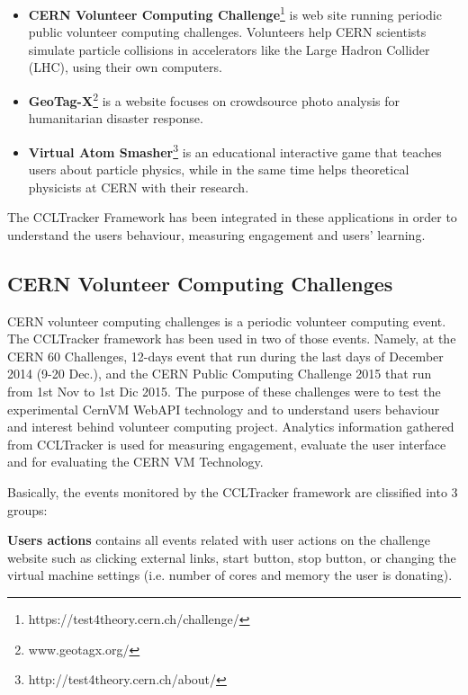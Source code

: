 \documentclass{article}
\begin{document}
\begin{itemize}
\item \textbf{CERN Volunteer Computing Challenge}\footnote{https://test4theory.cern.ch/challenge/} is  web site running periodic public volunteer computing challenges. Volunteers help CERN scientists simulate particle collisions in accelerators like the Large Hadron Collider (LHC), using their own computers. 

\item \textbf{GeoTag-X}\footnote{www.geotagx.org/} is a website focuses on crowdsource photo analysis for humanitarian disaster response.

\item \textbf{Virtual Atom Smasher}\footnote{http://test4theory.cern.ch/about/} is an educational interactive game that teaches users about particle physics, while in the same time helps theoretical physicists at CERN with their research.
\end{itemize}


The CCLTracker Framework has been integrated in these applications in order to understand the users behaviour, measuring engagement and users' learning. 


\subsection{CERN Volunteer Computing Challenges}

CERN volunteer computing challenges is a periodic volunteer computing event. The CCLTracker framework has been used in two of those events. Namely, at the CERN 60 Challenges, 12-days event that run during the last days of December 2014 (9-20 Dec.), and the CERN Public Computing Challenge 2015 that run from 1st Nov to 1st Dic 2015. The purpose of these challenges were to test the experimental CernVM WebAPI technology and to understand users behaviour and interest behind volunteer computing project. Analytics information gathered from CCLTracker is used for measuring engagement, evaluate the user interface and for evaluating the CERN VM Technology. 

Basically, the events monitored by the CCLTracker framework are clissified into 3 groups:

\textbf{Users actions} contains all events related with user actions on the challenge website such as clicking external links, start button,  stop button, or changing the  virtual machine settings (i.e. number of cores and memory the user is donating). 
\end{document}
